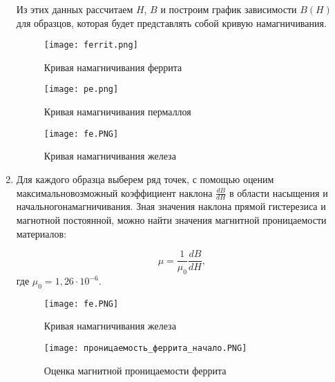 \documentclass[12pt,a4paper]{article}
\begin{document}
\begin{enumerate}
    Из этих данных рассчитаем $H$, $B$ и построим график зависимости $B(H)$ для образцов, которая будет представлять собой кривую намагничивания.

    \begin{figure}[H]
        \begin{center}
        \texttt{[image: ferrit.png]}
        \caption{Кривая намагничивания феррита}
        \label{ferrit} 
        \end{center}
    \end{figure}

    \begin{figure}[H]
        \begin{center}
        \texttt{[image: pe.png]}
        \caption{Кривая намагничивания пермаллоя}
        \label{pe} %
        \end{center}
    \end{figure}
    
    \begin{figure}[H]
        \begin{center}
            \texttt{[image: fe.PNG]}
            \caption{Кривая намагничивания железа}
            \label{fe} %
        \end{center}
    \end{figure}
    
    \item Для каждого образца выберем ряд точек, с помощью оценим максимальновозможный коэффициент наклона $\frac{dB}{dH}$ в области насыщения и начальногонамагничивания.
    Зная значения наклона прямой гистерезиса и магнотной постоянной, можно найти значения магнитной проницаемости материалов:

    \begin{equation}
        \mu = \frac{1}{\mu_0}\frac{dB}{dH}, \label{eq:ref}
    \end{equation}   
    где $\mu_0 = 1,26 \cdot 10^{-6} $.

    \begin{figure}[H]
        \begin{center}
            \texttt{[image: fe.PNG]}
            \caption{Кривая намагничивания железа}
            \label{fe} %
        \end{center}
    \end{figure}

    \begin{figure}[H]
        \begin{center}
            \texttt{[image: проницаемость\_феррита\_начало.PNG]}
            \caption{Оценка магнитной проницаемости феррита}
            \label{fe} %
        \end{center}
    \end{figure}


\end{enumerate}
\end{document}
